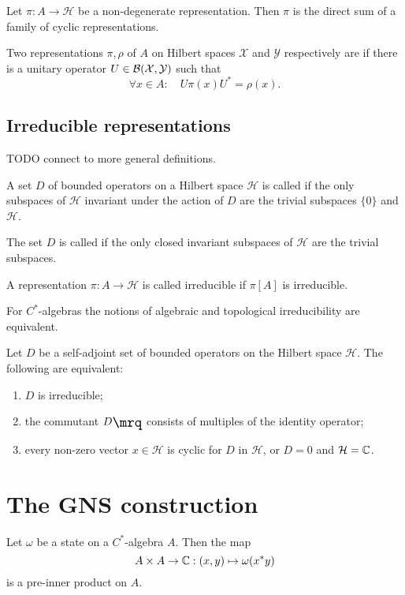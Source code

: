 \begin{proposition}
Let $\pi:A\to \mathcal{H}$ be a non-degenerate representation. Then $\pi$ is the direct sum of a family of cyclic representations.
\end{proposition}

\begin{definition}
Two representations $\pi,\rho$ of $A$ on Hilbert spaces $\mathcal{X}$ and $\mathcal{Y}$ respectively are  if there is a unitary operator $U\in\operatorname{\mathcal{B}}(\mathcal{X}, \mathcal{Y})$ such that
\[ \forall x\in A: \quad U\pi(x)U^* = \rho(x). \]
\end{definition}

\subsection{Irreducible representations}
TODO connect to more general definitions.
\begin{definition}
A set $D$ of bounded operators on a Hilbert space $\mathcal{H}$ is called  if the only subspaces of $\mathcal{H}$ invariant under the action of $D$ are the trivial subspaces $\{0\}$ and $\mathcal{H}$.

The set $D$ is called  if the only closed invariant subspaces of $\mathcal{H}$ are the trivial subspaces.

A representation $\pi: A\to\mathcal{H}$ is called irreducible if $\pi[A]$ is irreducible.
\end{definition}
\begin{proposition}
For $C^*$-algebras the notions of algebraic and topological irreducibility are equivalent.
\end{proposition}

\begin{proposition}
Let $D$ be a self-adjoint set of bounded operators on the Hilbert space $\mathcal{H}$. The following are equivalent:
\begin{enumerate}
\item $D$ is irreducible;
\item the commutant $\comm{D}$ consists of multiples of the identity operator;
\item every non-zero vector $x\in\mathcal{H}$ is cyclic for $D$ in $\mathcal{H}$, or $D =0$ and $\mathcal{H} = \mathbb{C}$.
\end{enumerate}
\end{proposition}

\section{The GNS construction}
\begin{lemma}
Let $\omega$ be a state on a $C^*$-algebra $A$. Then the map
\[ A\times A \to \mathbb{C}: (x,y)\mapsto \omega(x^*y) \]
is a pre-inner product on $A$.
\end{lemma}

